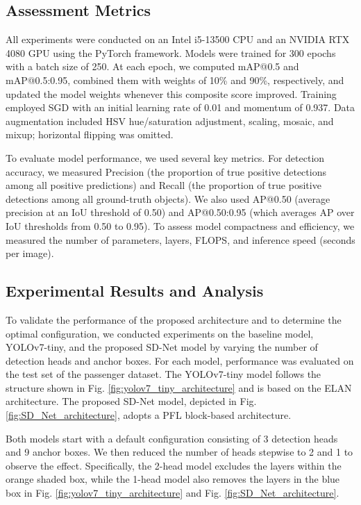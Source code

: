 \documentclass[journal,twoside,web]{ieeecolor}
\begin{document}
\subsection{Assessment Metrics}
All experiments were conducted on an Intel i5-13500 CPU and an NVIDIA RTX 4080 GPU using the PyTorch framework. Models were trained for 300 epochs with a batch size of 250. At each epoch, 
we computed mAP@0.5 and mAP@0.5:0.95, combined them with weights of 10\% and 90\%, respectively, and updated the model weights whenever this composite score improved. Training employed \ac{SGD} with an initial learning rate of 0.01 and momentum of 0.937. Data augmentation included HSV hue/saturation adjustment, scaling, mosaic, and mixup; horizontal flipping was omitted.

To evaluate model performance, we used several key metrics. For detection accuracy, we measured Precision (the proportion of true positive detections among all positive predictions) and Recall (the proportion of true positive detections among all ground-truth objects). We also used AP@0.50 (average precision at an \ac{IoU} threshold of 0.50) and AP@0.50:0.95 (which averages \ac{AP} over \ac{IoU} thresholds from 0.50 to 0.95). To assess model compactness and efficiency, we measured the number of parameters, layers, \ac{FLOPS}, and inference speed (seconds per image).


\subsection{Experimental Results and Analysis}
To validate the performance of the proposed architecture and to determine the optimal configuration, we conducted experiments on the baseline model, YOLOv7-tiny, and the proposed \ac{SD-Net} model by varying the number of detection heads and anchor boxes. For each model, performance was evaluated on the test set of the passenger dataset. The YOLOv7-tiny model follows the structure 
shown in Fig. \ref{fig:yolov7_tiny_architecture} and is based on the \ac{ELAN} architecture. The proposed \ac{SD-Net} model, depicted in Fig. \ref{fig:SD_Net_architecture}, adopts a \ac{PFL} block-based architecture. 

Both models start with a default configuration consisting of 3 detection heads and 9 anchor boxes. We then reduced the number of heads stepwise to 2 and 1 to observe the effect. Specifically, the 2-head model excludes the layers within the orange shaded box, while the 1-head model also removes the layers in the blue box in Fig. \ref{fig:yolov7_tiny_architecture} and Fig. \ref{fig:SD_Net_architecture}.
\end{document}
